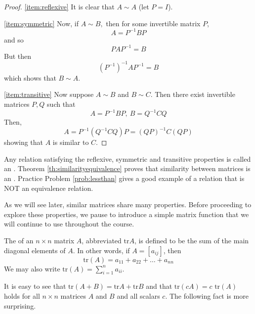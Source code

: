 \documentclass{ximera}
\begin{document}
\begin{proof}
\ref{item:reflexive} It is clear that $A\sim A$ (let $P=I$).

\ref{item:symmetric}
Now, if $A\sim B,$ then for some invertible matrix $P$,
\begin{equation*}
A=P^{-1}BP
\end{equation*}
and so
\begin{equation*}
PAP^{-1}=B
\end{equation*}
But then
\begin{equation*}
\left( P^{-1}\right) ^{-1}AP^{-1}=B
\end{equation*}
which shows that $B\sim A$.

\ref{item:transitive}
Now suppose $A\sim B$ and $B\sim C$. Then there exist invertible matrices
$P,Q$ such that
\begin{equation*}
A=P^{-1}BP,\ B=Q^{-1}CQ
\end{equation*}
Then,
\begin{equation*}
A=P^{-1} \left( Q^{-1}CQ \right)P=\left( QP\right) ^{-1}C\left( QP\right)
\end{equation*}
showing that $A$ is similar to $C$.
\end{proof}

Any relation satisfying the reflexive, symmetric and transitive properties is called an  .  Theorem \ref{th:similarityequivalence} proves that similarity between matrices is an .  Practice Problem \ref{prob:lessthan} gives a good example of a relation that is NOT an equivalence relation.

As we will see later, similar matrices share many properties. 
 Before proceeding to explore these properties, we pause to introduce a simple matrix function that we will continue to use throughout the course.  %

\begin{definition}\label{def:trace}
The  of an $n \times n$ matrix $A$, abbreviated $\mbox{tr} A$, is defined to be the sum of the main diagonal elements of $A$.  In other words, if $ A = [a_{ij}]$, then $$\mbox{tr}(A) = a_{11} + a_{22} + \dots + a_{nn}$$  We may also write $\mbox{tr}(A) =\sum_{i=1}^n a_{ii}$.
\end{definition}

It is easy to see that $\mbox{tr}(A + B) = \mbox{tr} A + \mbox{tr} B$ and that $\mbox{tr}(cA) = c \mbox{ tr}(A)$ holds for all $n \times n$ matrices $A$ and $B$ and all scalars $c$. The following fact is more surprising.
\end{document}
